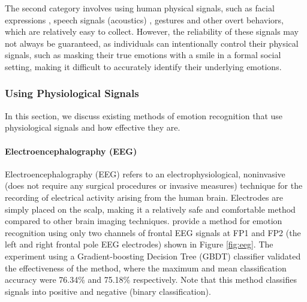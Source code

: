 \documentclass[12pt, a4paper]{article}
\begin{document}
The second category involves using human physical signals, such as facial expressions \citep{7752782}, speech signals (acoustics) \citep{mao2014learning}, gestures \citep{gestures} and other overt behaviors, which are relatively easy to collect. However, the reliability of these signals may not always be guaranteed, as individuals can intentionally control their physical signals, such as masking their true emotions with a smile in a formal social setting, making it difficult to accurately identify their underlying emotions.


\subsubsection{Using Physiological Signals}

In this section, we discuss existing methods of emotion recognition that use physiological signals and how effective they are.

\paragraph{Electroencephalography (EEG)}

Electroencephalography (EEG) refers to an electrophysiological, noninvasive (does not require any surgical procedures or invasive measures) technique for the recording of electrical activity arising from the human brain. Electrodes are simply placed on the scalp, making it a relatively safe and comfortable method compared to other brain imaging techniques. \cite{wu2017estimation} provide a method for emotion recognition using only two channels of frontal EEG signals at FP1 and FP2 (the left and right frontal pole EEG electrodes) shown in Figure \ref{fig:eeg}. The experiment using a Gradient-boosting Decision Tree (GBDT) classifier validated the effectiveness of the method, where the maximum and mean classification accuracy were 76.34\% and 75.18\% respectively. Note that this method classifies signals into positive and negative (binary classification). 
\end{document}
